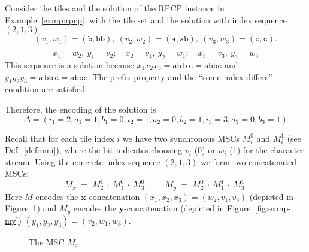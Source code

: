 \begin{example}
Consider the tiles and the solution of the RPCP instance 
in Example~\ref{exmp:rpcp}, with the tile set and the solution
with index sequence $(2,1,3)$
$$
 (v_1,w_1)=(\texttt{b},\texttt{bb}),\ 
 (v_2,w_2)=(\texttt{a},\texttt{ab}),\ 
 (v_3,w_3)=(\texttt{c},\texttt{c}).
$$

$$
 x_1=w_2,\ y_1=v_2;\quad x_2=v_1,\ y_2=w_1;\quad x_3=v_3,\ y_3=w_3
$$
This sequence is a solution because
$x_1x_2x_3=\texttt{ab}\,\texttt{b}\,\texttt{c}=\texttt{abbc}$ and
$y_1y_2y_3=\texttt{a}\,\texttt{bb}\,\texttt{c}=\texttt{abbc}$. The
prefix property and the ``some index differs'' condition are satisfied.

Therefore, the encoding of the solution is
$$\Delta = (i_1=2,a_1=1,b_1=0,i_2=1,a_2=0,b_2=1,i_3=3,a_3=0,b_3=1)$$

Recall that for each tile index \(i\) we have two synchronous MSCs
\(M_i^0\) and \(M_i^1\) (see Def.~\ref{def:mni}), where the bit
indicates choosing \(v_i\) (0) or \(w_i\) (1) for the character stream.
Using the concrete index sequence \((2,1,3)\) we form two
concatenated MSCs:
\[
  M_x\;=\; M^{1}_{2}\ \cdot\ M^{0}_{1}\ \cdot\ M^{0}_{3},
\qquad
  M_y\;=\; M^{0}_{2}\ \cdot\ M^{1}_{1}\ \cdot\ M^{1}_{3}.
\]
Here \(M\) encodes the \(\mathbf{x}\)-concatenation
\((x_1,x_2,x_3)=(w_2,v_1,v_3)\) (depicted 
in Figure~\ref{fig:exmp-mx}) and \(M_y\) encodes 
the \(\mathbf{y}\)-concatenation (depicted in 
Figure~\ref{fig:exmp-my}) \((y_1,y_2,y_3)=(v_2,w_1,w_3)\).

\begin{figure}[!ht]
\centering
\begin{msc}[draw frame=none, draw head=none, msc keyword=, head height=0px, label distance=0.5ex, foot height=0px, foot distance=0px]{}
	\declinst{P2}{P2}{}



\end{msc}
\caption{The MSC $M_x$}
\label{fig:exmp-mx}
\end{figure}



\end{example}
